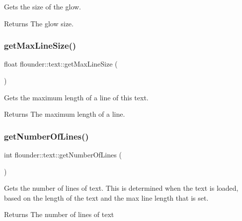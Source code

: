Gets the size of the glow. 

\begin{DoxyReturn}{Returns}
The glow size. 
\end{DoxyReturn}
\mbox{\label{classflounder_1_1text_a4135aa153773c627b6b83a34b1f2ee1f}} 
\subsubsection{\texorpdfstring{get\+Max\+Line\+Size()}{getMaxLineSize()}}
{\footnotesize\ttfamily float flounder\+::text\+::get\+Max\+Line\+Size (\begin{DoxyParamCaption}{ }\end{DoxyParamCaption})\hspace{0.3cm}{\ttfamily [inline]}}



Gets the maximum length of a line of this text. 

\begin{DoxyReturn}{Returns}
The maximum length of a line. 
\end{DoxyReturn}
\mbox{\label{classflounder_1_1text_a19354c6e61de672476d09163291b9346}} 
\subsubsection{\texorpdfstring{get\+Number\+Of\+Lines()}{getNumberOfLines()}}
{\footnotesize\ttfamily int flounder\+::text\+::get\+Number\+Of\+Lines (\begin{DoxyParamCaption}{ }\end{DoxyParamCaption})\hspace{0.3cm}{\ttfamily [inline]}}



Gets the number of lines of text. This is determined when the text is loaded, based on the length of the text and the max line length that is set. 

\begin{DoxyReturn}{Returns}
The number of lines of text 
\end{DoxyReturn}
\mbox{\label{classflounder_1_1text_a494f99a95dde793f20e9d2a46f34b217}} 
